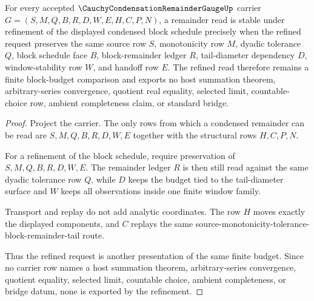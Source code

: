 \begin{theorem}
\label{thm:cauchy-condensation-remainder-gauge-block-stability}
For every accepted $\CauchyCondensationRemainderGaugeUp$ carrier $G=(S,M,Q,B,R,D,W,E,H,C,P,N)$, a remainder read is stable under refinement of the displayed condensed block schedule precisely when the refined request preserves the same source row $S$, monotonicity row $M$, dyadic tolerance $Q$, block schedule face $B$, block-remainder ledger $R$, tail-diameter dependency $D$, window-stability row $W$, and handoff row $E$. The refined read therefore remains a finite block-budget comparison and exports no host summation theorem, arbitrary-series convergence, quotient real equality, selected limit, countable-choice row, ambient completeness claim, or standard bridge.
\end{theorem}
\begin{proof}
Project the carrier. The only rows from which a condensed remainder can be read are $S,M,Q,B,R,D,W,E$ together with the structural rows $H,C,P,N$.

For a refinement of the block schedule, require preservation of $S,M,Q,B,R,D,W,E$. The remainder ledger $R$ is then still read against the same dyadic tolerance row $Q$, while $D$ keeps the budget tied to the tail-diameter surface and $W$ keeps all observations inside one finite window family.

Transport and replay do not add analytic coordinates. The row $H$ moves exactly the displayed components, and $C$ replays the same source-monotonicity-tolerance-block-remainder-tail route.

Thus the refined request is another presentation of the same finite budget. Since no carrier row names a host summation theorem, arbitrary-series convergence, quotient equality, selected limit, countable choice, ambient completeness, or bridge datum, none is exported by the refinement.
\end{proof}

